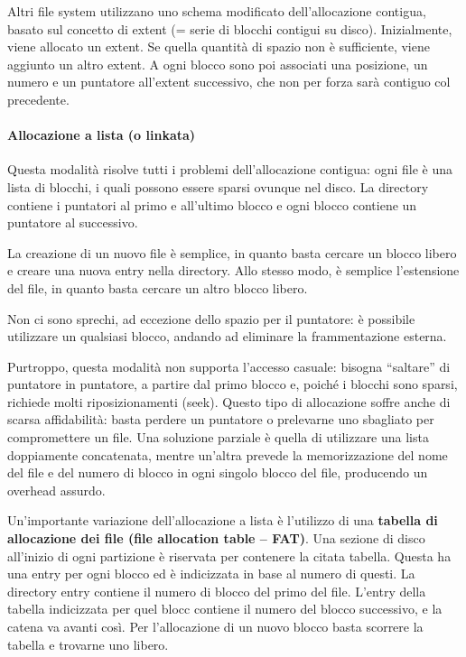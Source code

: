 \documentclass[a4]{article}
\begin{document}
Altri file system utilizzano uno schema modificato dell'allocazione contigua, basato sul concetto di extent (= serie di blocchi contigui su disco). Inizialmente, viene allocato un extent. Se quella quantità di spazio non è sufficiente, viene aggiunto un altro extent. A ogni blocco sono poi associati una posizione, un numero e un puntatore all'extent successivo, che non per forza sarà contiguo col precedente.

\paragraph{Allocazione a lista (o linkata)}
Questa modalità risolve tutti i problemi dell'allocazione contigua: ogni file è una lista di blocchi, i quali possono essere sparsi ovunque nel disco. La directory contiene i puntatori al primo e all'ultimo blocco e ogni blocco contiene un puntatore al successivo.

La creazione di un nuovo file è semplice, in quanto basta cercare un blocco libero e creare una nuova entry nella directory. Allo stesso modo, è semplice l'estensione del file, in quanto basta cercare un altro blocco libero.

Non ci sono sprechi, ad eccezione dello spazio per il puntatore: è possibile utilizzare un qualsiasi blocco, andando ad eliminare la frammentazione esterna.

Purtroppo, questa modalità non supporta l'accesso casuale: bisogna ``saltare'' di puntatore in puntatore, a partire dal primo blocco e, poiché i blocchi sono sparsi, richiede molti riposizionamenti (seek). Questo tipo di allocazione soffre anche di scarsa affidabilità: basta perdere un puntatore o prelevarne uno sbagliato per compromettere un file. Una soluzione parziale è quella di utilizzare una lista doppiamente concatenata, mentre un'altra prevede la memorizzazione del nome del file e del numero di blocco in ogni singolo blocco del file, producendo un overhead assurdo.

Un'importante variazione dell'allocazione a lista è l'utilizzo di una \textbf{tabella di allocazione dei file (file allocation table -- FAT)}. Una sezione di disco all'inizio di ogni partizione è riservata per contenere la citata tabella. Questa ha una entry per ogni blocco ed è indicizzata in base al numero di questi. La directory entry contiene il numero di blocco del primo del file. L'entry della tabella indicizzata per quel blocc contiene il numero del blocco successivo, e la catena va avanti così. Per l'allocazione di un nuovo blocco basta scorrere la tabella e trovarne uno libero.
\end{document}

